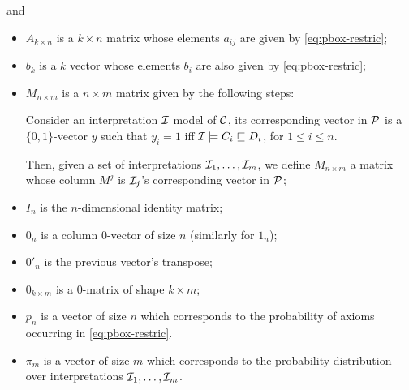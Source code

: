 and
\begin{itemize}
	\item $A_{k \times n}$ is a $k \times n$ matrix whose elements $a_{ij}$ are given by \autoref{eq:pbox-restric};
	\item $b_k$ is a $k$ vector whose elements $b_i$ are also given by \autoref{eq:pbox-restric};
	\item $M_{n \times m}$ is a $n \times m$ matrix given by the following steps:

	      Consider an interpretation $\mathcal{I}$ model of $\mathcal{C}$, its corresponding vector in $\mathcal{P}$ is  a $\{0, 1\}$-vector $y$ such that $y_i = 1$ iff $\mathcal{I} \models C_i \sqsubseteq D_i$, for $1 \leq i \leq n$.

	      Then, given a set of interpretations $\mathcal{I}_1, \dots, \mathcal{I}_m$, we define $M_{n \times m}$ a matrix whose column $M^j$ is $\mathcal{I}_j$'s corresponding vector in $\mathcal{P}$;
	\item $I_n$ is the $n$-dimensional identity matrix;
	\item $0_n$ is a column $0$-vector of size $n$ (similarly for $1_n$);
	\item $0'_n$ is the previous vector's transpose;
	\item $0_{k \times m}$ is a $0$-matrix of shape $k \times m$;
	\item $p_n$ is a vector of size $n$ which corresponds to the probability of axioms occurring in \autoref{eq:pbox-restric}.
	\item $\pi_m$ is a vector of size $m$ which corresponds to the probability distribution over interpretations $\mathcal{I}_1, \dots, \mathcal{I}_m$.
\end{itemize}




